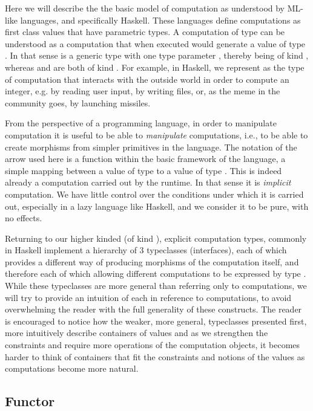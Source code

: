 Here we will describe the the basic model of computation as understood
by ML-like languages, and specifically Haskell. These languages define
computations as first class values that have parametric types. A
computation of type  can be understood as a computation that
when executed would generate a value of type . In that sense
 is a generic type with one type parameter , thereby
being of kind \hask{* -> *}, whereas  and  are both
of kind \hask{*}. For example, in Haskell, we represent as  the type of computation that interacts with the outside world
in order to compute an integer, e.g. by reading user input, by writing
files, or, as the meme in the community goes, by launching missiles.

From the perspective of a programming language, in order to manipulate
computation it is useful to be able to \emph{manipulate} computations, i.e., to
be able to create morphisms  from simpler primitives
in the language. The notation of the arrow \hask{->} used here is a
function within the basic framework of the language, a simple mapping
between a value of type  to a value of type . This
is indeed already a computation carried out by the runtime.  In that
sense it is \emph{implicit} computation. We have little control over
the conditions under which it is carried out, especially in a lazy
language like Haskell, and we consider it to be pure, with no
effects.

Returning to our higher kinded (of kind \hask{* -> *}), explicit
computation types, commonly in Haskell implement a hierarchy of 3 typeclasses
(interfaces), each
of which provides a different way of producing morphisms of the
computation itself, and therefore each of which allowing different
computations to be expressed by type . While these typeclasses are
more general than referring only to computations, we will try to
provide an intuition of each in reference to computations, to
avoid overwhelming the reader with the full generality of these
constructs. The reader is encouraged to notice how the weaker, more
general, typeclasses presented first, more intuitively describe
containers of values and as we strengthen the constraints and require
more operations of the computation objects, it becomes harder to think of
containers that fit the constraints and notions of the values as
computations become more natural.

\subsection{Functor}

